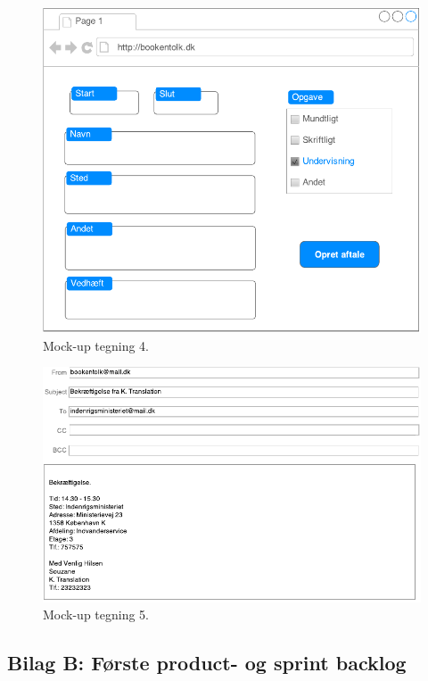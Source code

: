 \documentclass[12pt]{article}   %
\begin{document}
\begin{figure}[!ht]
\begin{center}
\includegraphics{mock4.pdf}
\caption{Mock-up tegning 4.}
\end{center}
\end{figure}


\newpage

\begin{figure}[!ht]
\begin{center}
\includegraphics{mock5.pdf}
\caption{Mock-up tegning 5.}
\end{center}
\end{figure}

\newpage

\subsection{Bilag B: Første product- og sprint backlog}
\end{document}
